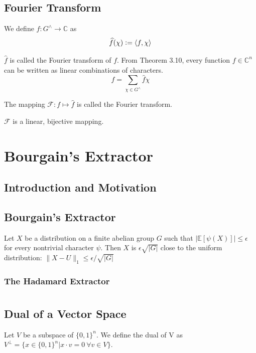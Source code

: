 \section{Fourier Transform}
\begin{definition}
We define $\widehat{f} : G^\land \rightarrow \mathbb{C}$ as
$$\widehat{f}(\chi) \vcentcolon= \langle f, \chi \rangle $$
\end{definition}
$\widehat{f}$ is called the Fourier transform of $f$.
From Theorem 3.10, every function $f \in \mathbb{C}^n$ can be written as linear combinations of characters. 
$$f = \sum\limits_{\chi \in G^\land} \widehat{f} \chi$$

\begin{definition}
The mapping $\mathcal{F} : f \mapsto \widehat{f}$ is called the Fourier transform. 
\end{definition}

\begin{prop}
$\mathcal{F}$ is a linear, bijective mapping. 
\end{prop}

\chapter{Bourgain's Extractor}

\section{Introduction and Motivation}

\section{Bourgain's Extractor}
\begin{lemma}
Let $X$ be a distribution on a finite abelian group $G$ such that $|\mathbb{E}[\psi (X)] | \leq \epsilon$ for every nontrivial character $\psi$. Then $X$ is $\epsilon \sqrt{|G|}$ close to the uniform distribution: $\| X - U \|_1 \leq \epsilon / \sqrt{|G|}$
\end{lemma}
\subsection{The Hadamard Extractor}

\appendix

\chapter{}
\section{Dual of a Vector Space}
\begin{definition} 
Let $V$ be a subspace of $\{0,1\}^n$. 
We define the dual of V as 
$V^\perp = \{ x \in \{ 0,1 \}^n | x \cdot v = 0 \ \forall v \in V \}$.
\end{definition}

